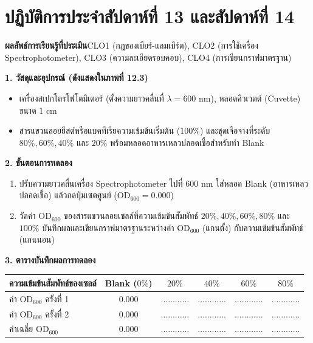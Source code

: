 \section{ปฏิบัติการประจำสัปดาห์ที่ 13 และสัปดาห์ที่ 14}


\begin{labbox}
\noindent\textbf{ผลลัพธ์การเรียนรู้ที่ประเมิน}\quad CLO1 (กฎของเบียร์-แลมเบิร์ต), CLO2 (การใช้เครื่อง Spectrophotometer), CLO3 (ความละเอียดรอบคอบ), CLO4 (การเขียนกราฟมาตรฐาน)

\vspace{4pt}
\noindent\textbf{1. วัสดุและอุปกรณ์ (ดังแสดงใน\mbox{ภาพที่} 12.3)}
\begin{itemize}
    \item เครื่องสเปกโตรโฟโตมิเตอร์ (ตั้งความยาวคลื่นที่ $\lambda = 600\text{ nm}$), หลอดคิวเวตต์ (Cuvette) ขนาด $1\text{ cm}$
    \item สารแขวนลอยยีสต์หรือแบคทีเรียความเข้มข้นเริ่มต้น ($100\%$) และชุดเจือจางที่ระดับ $80\%, 60\%, 40\%$ และ $20\%$ พร้อมหลอดอาหารเหลวปลอดเชื้อสำหรับทำ Blank
\end{itemize}

\noindent\textbf{2. ขั้นตอนการทดลอง}
\begin{enumerate}
    \item ปรับความยาวคลื่นเครื่อง Spectrophotometer ไปที่ $600\text{ nm}$ ใส่หลอด Blank (อาหารเหลวปลอดเชื้อ) แล้วกดปุ่มเซตศูนย์ ($\text{OD}_{600} = 0.000$)
    \item วัดค่า $\text{OD}_{600}$ ของสารแขวนลอยเซลล์ที่ความเข้มข้นสัมพัทธ์ $20\%, 40\%, 60\%, 80\%$ และ $100\%$ บันทึกผลและเขียนกราฟมาตรฐานระหว่างค่า $\text{OD}_{600}$ (แกนตั้ง) กับความเข้มข้นสัมพัทธ์ (แกนนอน)
\end{enumerate}

\noindent\textbf{3. ตารางบันทึกผลการทดลอง}
\begin{center}
\footnotesize\setlength{\tabcolsep}{3.5pt}
\begin{tabularx}{\linewidth}{>{\raggedright\arraybackslash}X c c c c c}
\toprule
\textbf{ความเข้มข้นสัมพัทธ์ของเซลล์} & \textbf{Blank ($0\%$)} & \textbf{$20\%$} & \textbf{$40\%$} & \textbf{$60\%$} & \textbf{$80\%$} \\
\midrule
ค่า $\text{OD}_{600}$ ครั้งที่ 1 & $0.000$ & ............ & ............ & ............ & ............ \\
ค่า $\text{OD}_{600}$ ครั้งที่ 2 & $0.000$ & ............ & ............ & ............ & ............ \\
ค่าเฉลี่ย $\text{OD}_{600}$ & $0.000$ & ............ & ............ & ............ & ............ \\
\bottomrule
\end{tabularx}
\end{center}
\end{labbox}

